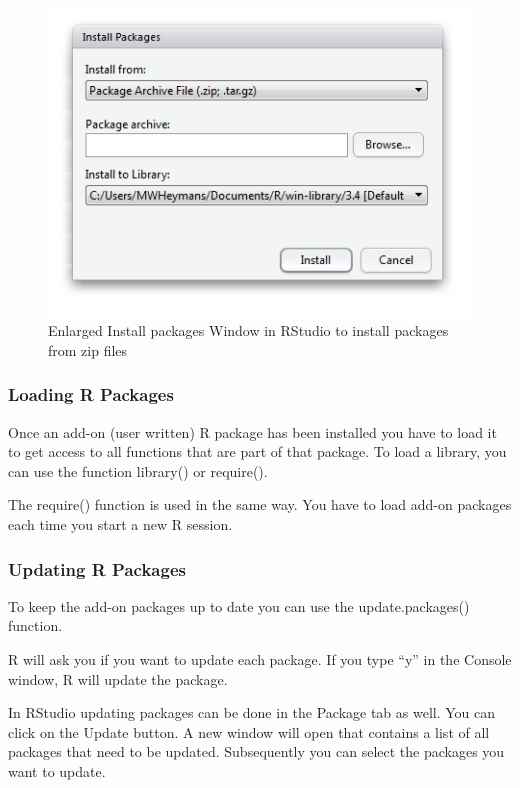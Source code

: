 \documentclass[]{book}
\theoremstyle{definition}
\theoremstyle{definition}
\theoremstyle{definition}
\theoremstyle{remark}
\begin{document}
\begin{figure}

{\centering \includegraphics[width=0.8\linewidth]{images/fig1.26b} 

}

\caption{Enlarged Install packages Window in RStudio to install packages from zip files}\label{fig:fig28}
\end{figure}

\subsubsection{Loading R Packages}\label{loading-r-packages}

Once an add-on (user written) R package has been installed you have to
load it to get access to all functions that are part of that package. To
load a library, you can use the function library() or require().

The require() function is used in the same way. You have to load add-on
packages each time you start a new R session.

\subsubsection{Updating R Packages}\label{updating-r-packages}

To keep the add-on packages up to date you can use the update.packages()
function.

R will ask you if you want to update each package. If you type ``y'' in
the Console window, R will update the package.

In RStudio updating packages can be done in the Package tab as well. You
can click on the Update button. A new window will open that contains a
list of all packages that need to be updated. Subsequently you can
select the packages you want to update.
\end{document}

